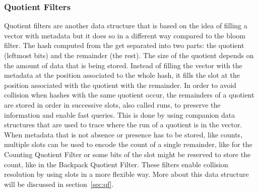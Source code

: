 \subsubsection{Quotient Filters}
Quotient filters are another data structure that is based on the idea of filling a vector with metadata but it does so in a different way compared to the bloom filter.
The hash computed from the \kmer get separated into two parts: the quotient (leftmost bits) and the remainder (the rest). The size of the quotient depends on the amount of data that is being stored. Instead of filling the vector with the metadata at the position associated to the whole hash, it fills the slot at the position associated with the quotient with the remainder. In order to avoid collision when hashes with the same quotient occur, the remainders of a quotient are stored in order in successive slots, also called runs, to preserve the information and enable fast queries. This is done by using companion data structures that are used to trace where the run of a quotient is in the vector. When metadata that is not absence or presence has to be stored, like counts, multiple slots can be used to encode the count of a single remainder, like for the Counting Quotient Filter or some bits of the slot might be reserved to store the count, like in the Backpack Quotient Filter.
These filters enable collision resolution by using slots in a more flexible way. More about this data structure will be discussed in section~\ref{sec:qf}.

